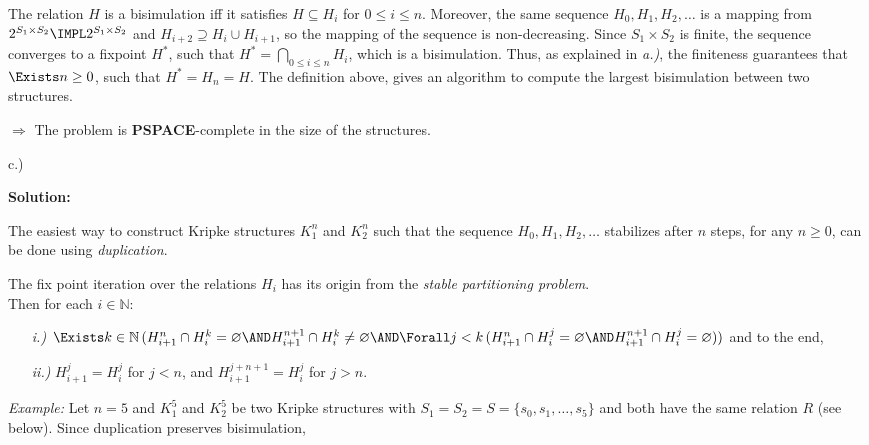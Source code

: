 \bigskip 

The relation $H$ is a bisimulation iff it satisfies $H\subseteq H_{i}$ for $%
0\leq i\leq n$. Moreover, the same sequence $H_{0},H_{1},H_{2},\ldots $ is a
mapping from $2^{S_{1}\times S_{2}}\IMPL 2^{S_{1}\times S_{2}}$ and $%
H_{i+2}\supseteq H_{i}\cup H_{i+1}$, so the mapping of the sequence is
non-decreasing. Since $S_{1}\times S_{2}$ is finite, the sequence converges
to a fixpoint $H^{\ast }$, such that $H^{\ast }=\bigcap\nolimits_{0\leq
i\leq n}H_{i}$, which is a bisimulation. Thus, as explained in \textit{a.)},
the finiteness guarantees that $\Exists n\geq 0$, such that $H^{\ast
}=H_{n}=H$. The definition above, gives an algorithm to compute the largest
bisimulation between two structures.

\bigskip 

$\Rightarrow $ The problem is \textbf{PSPACE}-complete in the size of the
structures.

\bigskip 

c.)

\textbf{Solution:}

\medskip

The easiest way to construct Kripke structures $K_{1}^{n}$ and $K_{2}^{n}$
such that the sequence $H_{0},H_{1},H_{2},\ldots $ stabilizes after $n$
steps, for any $n\geq 0$, can be done using \textit{duplication}.

The fix point iteration over the relations $H_{i}$ has its origin from the \textit{stable
partitioning problem}.\medskip\\

Then for each $i\in \mathbb{N}$:
\begin{enumerate}
\item[\textit{i.)}] $\Exists k\in \mathbb{N\,(}H_{i+1}^{n}\cap H_{i}^{k}=\varnothing \AND %
H_{i+1}^{n+1}\cap H_{i}^{k}\neq \varnothing \AND\Forall j<k\,(H_{i+1}^{n}%
\cap H_{i}^{j}=\varnothing \AND H_{i+1}^{n+1}\cap H_{i}^{j}=\varnothing ))$
and to the end,

\item[\textit{ii.)}] $H_{i+1}^{j}=H_{i}^{j}$ for $j<n$, and $%
H_{i+1}^{j+n+1}=H_{i}^{j}$ for $j>n.$
\end{enumerate}

\bigskip 

\textit{Example:} Let  $n=5$ and $K_{1}^{5}$ and $K_{2}^{5}$ be two Kripke
structures with $S_{1}=S_{2}=S=\{s_{0},s_{1},\ldots ,s_{5}\}$ and both have
the same relation $R$ (see below). Since duplication preserves bisimulation,

